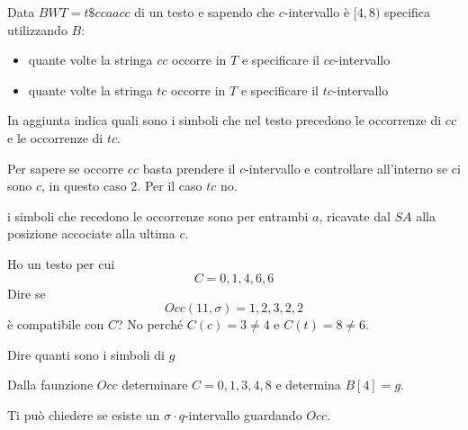 \begin{esempio}
    Data $BWT =t\$ccaacc$ di un testo e sapendo che $c$-intervallo è $[4,8)$
        specifica utilizzando $B$:
        \begin{itemize}
            \item quante volte la stringa $cc$ occorre in $T$ e specificare il $cc$-intervallo
            \item quante volte la stringa $tc$ occorre in $T$ e specificare il $tc$-intervallo
        \end{itemize}
        In aggiunta indica quali sono i simboli che nel testo precedono le occorrenze
        di $cc$ e le occorrenze di $tc$.

        Per sapere se occorre $cc$ basta prendere il $c$-intervallo e controllare all'interno
        se ci sono $c$, in questo caso $2$. Per il caso $tc$ no.

        i simboli che recedono le occorrenze sono per entrambi $a$, ricavate dal $SA$
        alla posizione accociate alla ultima $c$.
\end{esempio}
\begin{esempio}
    Ho un testo per cui
    $$C = 0,1,4,6,6$$
    Dire se
    $$Occ(11, \sigma) =1 , 2 , 3 , 2 , 2$$
    è compatibile con $C$? No perché $C(c) = 3 \ne 4$ e $C(t) = 8 \ne 6$.

    Dire quanti sono i simboli di $g$
\end{esempio}
\begin{esempio}
    Dalla faunzione $Occ$ determinare $C = 0,1,3,4,8$  e determina $B[4] = g$.

    Ti può chiedere se esiste un $\sigma\cdot q$-intervallo guardando $Occ$.
\end{esempio}